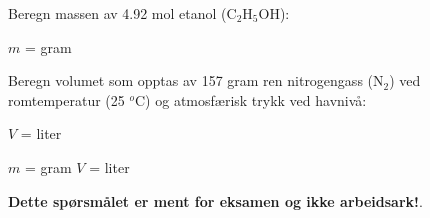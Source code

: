 

Beregn massen av 4.92 mol etanol (C$_{2}$H$_{5}$OH):

\vskip 10pt

$m$ = \underbar{\hskip 50pt} gram

\vskip 20pt

Beregn volumet som opptas av 157 gram ren nitrogengass (N$_{2}$) ved romtemperatur (25 $^{o}$C) og atmosfærisk trykk ved havnivå:

\vskip 10pt

$V$ = \underbar{\hskip 50pt} liter







$m$ =  gram  \hskip 30pt  $V$ =  liter







{\bf Dette spørsmålet er ment for eksamen og ikke arbeidsark!}.


